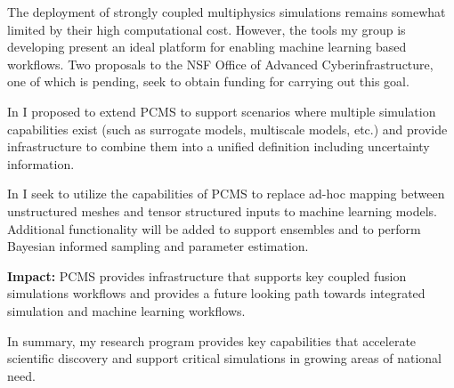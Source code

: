 The deployment of strongly coupled multiphysics simulations remains somewhat limited by their high computational cost. However, the tools my group is developing present an ideal platform for enabling machine learning based workflows. Two proposals to the NSF Office of Advanced Cyberinfrastructure, one of which is pending, seek to obtain funding for carrying out this goal.

In \cite{CAREER2025} I proposed to extend PCMS to support scenarios where multiple simulation capabilities exist (such as surrogate models, multiscale models, etc.) and provide infrastructure to combine them into a unified definition including uncertainty information.

In \cite{CSSI2025} I seek to utilize the capabilities of PCMS to replace ad-hoc mapping between unstructured meshes and tensor structured inputs to machine learning models. Additional functionality will be added to support ensembles and to perform Bayesian informed sampling and parameter estimation.

\textbf{Impact:} PCMS provides infrastructure that supports key coupled fusion simulations workflows and provides a future looking path towards integrated simulation and machine learning workflows.

In summary, my research program provides key capabilities that accelerate scientific discovery and support critical simulations in growing areas of national need.
